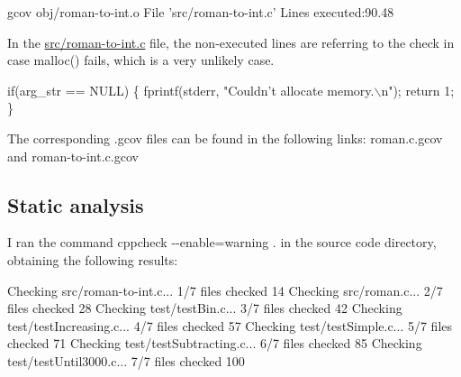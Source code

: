 \begin{DoxyCode}
gcov obj/roman-to-\textcolor{keywordtype}{int}.o
File \textcolor{stringliteral}{'src/roman-to-int.c'}
Lines executed:90.48%
\end{DoxyCode}


In the \hyperlink{roman-to-int_8c}{src/roman-\/to-\/int.\+c} file, the non-\/executed lines are referring to the check in case malloc() fails, which is a very unlikely case.


\begin{DoxyCode}
\textcolor{keywordflow}{if}(arg\_str == NULL) \{
    fprintf(stderr, \textcolor{stringliteral}{"Couldn't allocate memory.\(\backslash\)n"});
    \textcolor{keywordflow}{return} 1;
\}
\end{DoxyCode}


The corresponding .gcov files can be found in the following links\+: roman.\+c.\+gcov and roman-\/to-\/int.\+c.\+gcov

\subsection*{Static analysis }

I ran the command {\ttfamily cppcheck -\/-\/enable=warning .} in the source code directory, obtaining the following results\+:


\begin{DoxyCode}
Checking src/roman-to-\textcolor{keywordtype}{int}.c...
1/7 files checked 14%
Checking src/roman.c...
2/7 files checked 28%
Checking test/testBin.c...
3/7 files checked 42%
Checking test/testIncreasing.c...
4/7 files checked 57%
Checking test/testSimple.c...
5/7 files checked 71%
Checking test/testSubtracting.c...
6/7 files checked 85%
Checking test/testUntil3000.c...
7/7 files checked 100%
\end{DoxyCode}
 